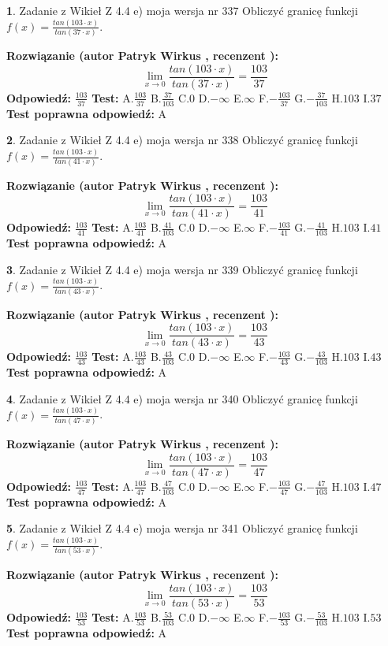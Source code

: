 \documentclass[12pt, a4paper]{article}
\theoremstyle{definition} %
\newtheorem{zad}{}
\newcommand{\zadStart}[1]{\begin{zad}#1\newline}
\newcommand{\zadStop}{\end{zad}}
\newcommand{\rozwStart}[2]{\noindent \textbf{Rozwiązanie (autor #1 , recenzent #2): }\newline}
\newcommand{\rozwStop}{\newline}
\newcommand{\odpStart}{\noindent \textbf{Odpowiedź:}\newline}
\newcommand{\odpStop}{\newline}
\newcommand{\testStart}{\noindent \textbf{Test:}\newline}
\newcommand{\testStop}{\newline}
\newcommand{\kluczStart}{\noindent \textbf{Test poprawna odpowiedź:}\newline}
\newcommand{\kluczStop}{\newline}
\begin{document}
\zadStart{Zadanie z Wikieł Z 4.4 e) moja wersja nr 337}
Obliczyć granicę funkcji $f(x)=\frac{tan(103\cdot x)}{tan(37\cdot x)}$.
\zadStop
\rozwStart{Patryk Wirkus}{}
$$\lim\limits_{x\to 0}\frac{tan(103\cdot x)}{tan(37\cdot x)}=
\frac{103}{37}$$
\rozwStop
\odpStart
$\frac{103}{37}$
\odpStop
\testStart
A.$\frac{103}{37}$
B.$\frac{37}{103}$
C.$0$
D.$-\infty$
E.$\infty$
F.$-\frac{103}{37}$
G.$-\frac{37}{103}$
H.$103$
I.$37$
\testStop
\kluczStart
A
\kluczStop



\zadStart{Zadanie z Wikieł Z 4.4 e) moja wersja nr 338}
Obliczyć granicę funkcji $f(x)=\frac{tan(103\cdot x)}{tan(41\cdot x)}$.
\zadStop
\rozwStart{Patryk Wirkus}{}
$$\lim\limits_{x\to 0}\frac{tan(103\cdot x)}{tan(41\cdot x)}=
\frac{103}{41}$$
\rozwStop
\odpStart
$\frac{103}{41}$
\odpStop
\testStart
A.$\frac{103}{41}$
B.$\frac{41}{103}$
C.$0$
D.$-\infty$
E.$\infty$
F.$-\frac{103}{41}$
G.$-\frac{41}{103}$
H.$103$
I.$41$
\testStop
\kluczStart
A
\kluczStop



\zadStart{Zadanie z Wikieł Z 4.4 e) moja wersja nr 339}
Obliczyć granicę funkcji $f(x)=\frac{tan(103\cdot x)}{tan(43\cdot x)}$.
\zadStop
\rozwStart{Patryk Wirkus}{}
$$\lim\limits_{x\to 0}\frac{tan(103\cdot x)}{tan(43\cdot x)}=
\frac{103}{43}$$
\rozwStop
\odpStart
$\frac{103}{43}$
\odpStop
\testStart
A.$\frac{103}{43}$
B.$\frac{43}{103}$
C.$0$
D.$-\infty$
E.$\infty$
F.$-\frac{103}{43}$
G.$-\frac{43}{103}$
H.$103$
I.$43$
\testStop
\kluczStart
A
\kluczStop



\zadStart{Zadanie z Wikieł Z 4.4 e) moja wersja nr 340}
Obliczyć granicę funkcji $f(x)=\frac{tan(103\cdot x)}{tan(47\cdot x)}$.
\zadStop
\rozwStart{Patryk Wirkus}{}
$$\lim\limits_{x\to 0}\frac{tan(103\cdot x)}{tan(47\cdot x)}=
\frac{103}{47}$$
\rozwStop
\odpStart
$\frac{103}{47}$
\odpStop
\testStart
A.$\frac{103}{47}$
B.$\frac{47}{103}$
C.$0$
D.$-\infty$
E.$\infty$
F.$-\frac{103}{47}$
G.$-\frac{47}{103}$
H.$103$
I.$47$
\testStop
\kluczStart
A
\kluczStop



\zadStart{Zadanie z Wikieł Z 4.4 e) moja wersja nr 341}
Obliczyć granicę funkcji $f(x)=\frac{tan(103\cdot x)}{tan(53\cdot x)}$.
\zadStop
\rozwStart{Patryk Wirkus}{}
$$\lim\limits_{x\to 0}\frac{tan(103\cdot x)}{tan(53\cdot x)}=
\frac{103}{53}$$
\rozwStop
\odpStart
$\frac{103}{53}$
\odpStop
\testStart
A.$\frac{103}{53}$
B.$\frac{53}{103}$
C.$0$
D.$-\infty$
E.$\infty$
F.$-\frac{103}{53}$
G.$-\frac{53}{103}$
H.$103$
I.$53$
\testStop
\kluczStart
A
\kluczStop
\end{document}
